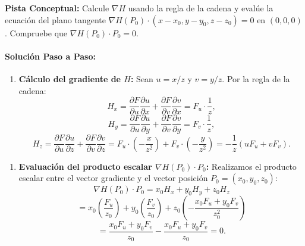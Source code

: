 \documentclass[11pt,a4paper]{article}
\begin{document}
\begin{tcolorbox}[colback=yellow!4,colframe=accentamber!70,arc=1mm,boxrule=0.5pt,left=3mm,right=3mm,top=1.5mm,bottom=1.5mm]
\textbf{Pista Conceptual:} Calcule $\nabla H$ usando la regla de la cadena y evalúe la ecuación del plano tangente $\nabla H(P_0) \cdot (x - x_0, y - y_0, z - z_0) = 0$ en $(0,0,0)$. Compruebe que $\nabla H(P_0) \cdot P_0 = 0$.
\end{tcolorbox}

\paragraph{Solución Paso a Paso:}\par
\begin{enumerate}[label=\textbf{\arabic*.}]
\item \textbf{Cálculo del gradiente de $H$:}
Sean $u = x/z$ y $v = y/z$. Por la regla de la cadena:
\begin{equation*}
H_x = \frac{\partial F}{\partial u} \frac{\partial u}{\partial x} + \frac{\partial F}{\partial v} \frac{\partial v}{\partial x} = F_u \cdot \frac{1}{z},
\end{equation*}
\begin{equation*}
H_y = \frac{\partial F}{\partial u} \frac{\partial u}{\partial y} + \frac{\partial F}{\partial v} \frac{\partial v}{\partial y} = F_v \cdot \frac{1}{z},
\end{equation*}
\begin{equation*}
H_z = \frac{\partial F}{\partial u} \frac{\partial u}{\partial z} + \frac{\partial F}{\partial v} \frac{\partial v}{\partial z} = F_u \cdot \left(-\frac{x}{z^2}\right) + F_v \cdot \left(-\frac{y}{z^2}\right) = -\frac{1}{z} \left( u F_u + v F_v \right).
\end{equation*}
\end{enumerate}

\begin{enumerate}[label=\textbf{\arabic*.}]
\item \textbf{Evaluación del producto escalar $\nabla H(P_0) \cdot P_0$:}
Realizamos el producto escalar entre el vector gradiente y el vector posición $P_0 = (x_0, y_0, z_0)$:
\begin{equation*}
\nabla H(P_0) \cdot P_0 = x_0 H_x + y_0 H_y + z_0 H_z
\end{equation*}
\begin{equation*}
= x_0 \left(\frac{F_u}{z_0}\right) + y_0 \left(\frac{F_v}{z_0}\right) + z_0 \left(-\frac{x_0 F_u + y_0 F_v}{z_0^2}\right)
\end{equation*}
\begin{equation*}
= \frac{x_0 F_u + y_0 F_v}{z_0} - \frac{x_0 F_u + y_0 F_v}{z_0} = 0.
\end{equation*}
\end{enumerate}
\end{document}
